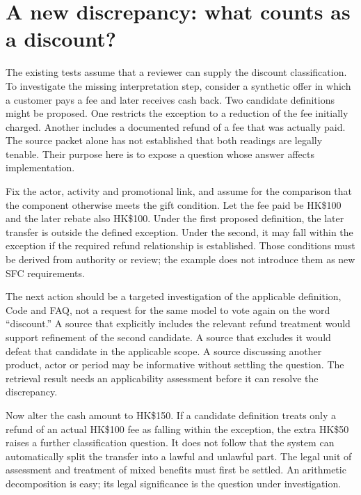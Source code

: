 \section{A new discrepancy: what counts as a discount?}
\label{merge:M02:06}

\label{sec:circular-cashback}
The existing tests assume that a reviewer can supply the discount classification.
To investigate the missing interpretation step, consider a synthetic offer in
which a customer pays a fee and later receives cash back. Two candidate
definitions might be proposed. One restricts the exception to a reduction of
the fee initially charged. Another includes a documented refund of a fee that
was actually paid. The source packet alone has not established that both
readings are legally tenable. Their purpose here is to expose a question whose
answer affects implementation.

Fix the actor, activity and promotional link, and assume for the comparison
that the component otherwise meets the gift condition. Let the fee paid be
HK\$100 and the later rebate also HK\$100. Under the first proposed definition,
the later transfer is outside the defined exception. Under the second, it may
fall within the exception if the required refund relationship is established.
Those conditions must be derived from authority or review; the example does
not introduce them as new SFC requirements.

The next action should be a targeted investigation of the applicable definition,
Code and FAQ, not a request for the same model to vote again on the word
``discount.'' A source that explicitly includes the relevant refund treatment
would support refinement of the second candidate. A source that excludes it
would defeat that candidate in the applicable scope. A source discussing
another product, actor or period may be informative without settling the
question. The retrieval result needs an applicability assessment before it can
resolve the discrepancy.


Now alter the cash amount to HK\$150. If a candidate definition treats only a
refund of an actual HK\$100 fee as falling within the exception, the extra
HK\$50 raises a further classification question. It does not follow that the
system can automatically split the transfer into a lawful and unlawful part.
The legal unit of assessment and treatment of mixed benefits must first be
settled. An arithmetic decomposition is easy; its legal significance is the
question under investigation.

